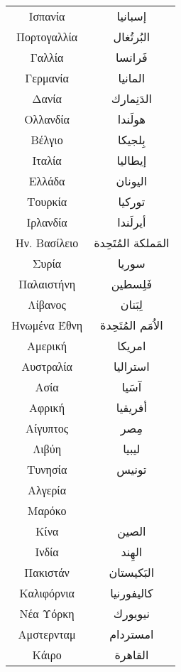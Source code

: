 \documentclass[twocolumn,a4paper]{article}
\newcommand{\ar}[1]{\textarabic{#1}}
\begin{document}
\begin{supertabular}{ c c }
Ισπανία      & \ar{ إسبانيا } \\
Πορτογαλλία  & \ar{ البُرتُغال } \\
Γαλλία       & \ar{ فَرانسا } \\
Γερμανία     & \ar{ المانيا } \\
Δανία        & \ar{  الدَنِمارك} \\
Ολλανδία     & \ar{ هولَندا } \\
Βέλγιο       & \ar{ بِلجيكا } \\

Ιταλία       & \ar{ إيطاليا } \\
Ελλάδα       & \ar{ اليونان } \\
Τουρκία      & \ar{ توركيا } \\

Ιρλανδία     & \ar{ أيرلَندا } \\
Ην. Βασίλειο & \ar{ المَملكة المُتَحِدة }\\

Συρία        & \ar{ سوريا } \\
Παλαιστήνη   & \ar{ فَلِسطين } \\
Λίβανος      & \ar{ لِبَنان } \\


Ηνωμένα Έθνη & \ar{ اﻻُمَم المُتَحِدة } \\
Αμερική      & \ar{ امريكا } \\
Αυστραλία    & \ar{ استراليا } \\
Ασία         & \ar{ آسَيا } \\
Αφρική       & \ar{ أفريقيا } \\

Αίγυπτος     & \ar{ مِصر } \\
Λιβύη        & \ar{ ليبيا } \\
Τυνησία      & \ar{ تونيس } \\
Αλγερία      & \\  %
Μαρόκο       & \\ %


Κίνα         & \ar{ الصين } \\
Ινδία        & \ar{ الهِند } \\
Πακιστάν     & \ar{ البَكيستان } \\
Καλιφόρνια   & \ar{ كاليفورنيا } \\
Νέα Υόρκη    & \ar{ نيويورك } \\
Αμστερνταμ   & \ar{ امستردام } \\
Κάιρο        & \ar{ القاهرة } \\


\end{supertabular}
\end{document}
